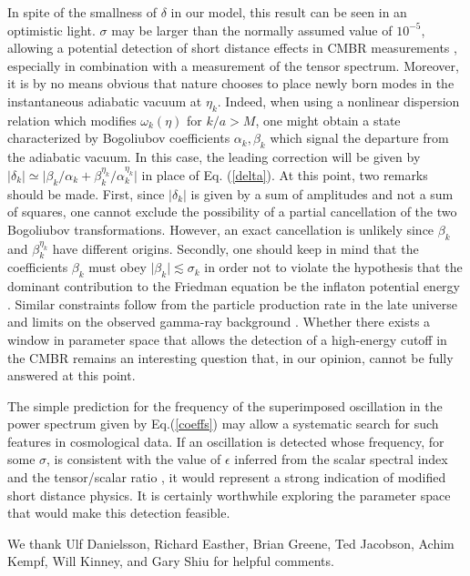 \documentclass[a4paper,aps,prd,preprint,groupedaddress,nofootinbib]{revtex4}
\begin{document}
In spite of the smallness of $\delta$ in our model, this
result can be seen in an optimistic light. $\sigma$ may be larger than
the   normally assumed value of $10^{-5}$, allowing a potential
detection of short distance effects in CMBR measurements
\cite{Eea01b,Kea02}, especially in combination with a measurement of
the tensor spectrum. Moreover, it is by no means obvious that nature
chooses to place newly born modes in the instantaneous adiabatic
vacuum at $\eta_k$.  Indeed, when using a nonlinear dispersion
relation which modifies $\omega_k(\eta)$ for $k/a > M$, one might
obtain a state characterized by Bogoliubov coefficients $\alpha_k,
\beta_k$ which signal the departure from the adiabatic vacuum. In this
case, the leading correction will be given by $\vert \delta_k \vert
\simeq \vert  \beta_k/\alpha_k +
\beta^{\eta_k}_k/\alpha^{\eta_k}_k\vert$ in place of
Eq. (\ref{delta}). At this point, two remarks should be made.  First,
since $\vert \delta_k \vert $ is given by a sum of amplitudes and not
a sum of squares, one cannot exclude the possibility of a partial
cancellation of the two Bogoliubov transformations. However, an exact
cancellation is unlikely since $\beta_k$ and 
$\beta_k^{\eta_k}$ have different origins.  Secondly, one should keep
in mind that the coefficients $\beta_k$  must obey $\vert \beta_k
\vert \lesssim \sigma_k$  in order not to  violate the
hypothesis that the dominant contribution  to the Friedman equation be
the inflaton potential energy \cite{T00,NP01,S01}. Similar constraints
follow from the particle production rate in the late universe and
limits on the observed gamma-ray background \cite{ST02}. Whether there
exists a window in parameter space that allows the detection of a
high-energy cutoff in the CMBR remains an interesting question that,
in our opinion, cannot be fully answered at this point.

The simple prediction for the frequency of the superimposed
oscillation in the power spectrum given by Eq.(\ref{coeffs}) may allow
a systematic search for such features in cosmological data. If an
oscillation is detected whose frequency, for some $\sigma$, is
consistent with the value of $\epsilon$ inferred from the scalar
spectral index and the tensor/scalar ratio \cite{K98b}, it would
represent a strong indication of modified 
short distance physics. It is certainly worthwhile exploring the
parameter space that would make this detection feasible.

\begin{acknowledgments}
We thank Ulf Danielsson, Richard Easther, Brian Greene, Ted Jacobson,
Achim Kempf, Will Kinney, and Gary Shiu for helpful comments.
\end{acknowledgments}


\end{document}
